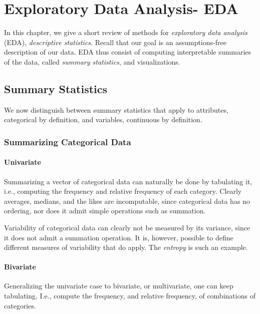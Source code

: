 \chapter[EDA]{Exploratory Data Analysis- EDA}
\label{sec:exploratory}


In this chapter, we give a short review of methods for \emph{exploratory data analysis} (EDA), \aka \emph{descriptive statistics}.
Recall that our goal is an assumptions-free description of our data. 
EDA thus consist of computing interpretable summaries of the data, called \emph{summary statistics}, and visualizations. 


\section{Summary Statistics}
\label{sec:summary_statistics}

We now distinguish between summary statistics that apply to attributes, categorical by definition, and variables, continuous by definition. 


\subsection{Summarizing Categorical Data}

\subsubsection{Univariate}
Summarizing a vector of categorical data can naturally be done by tabulating it, i.e., computing the frequency and relative frequency of each category.
Clearly averages, medians, and the likes are incomputable, since categorical data has no ordering, nor does it admit simple operations such as summation.

\begin{extra}
Variability of categorical data can clearly not be measured by its variance, since it does not admit a summation operation.
It is, however, possible to define different measures of variability that do apply.
The \emph{entropy} is such an example.
\end{extra}


\subsubsection{Bivariate}
Generalizing the univariate case to bivariate, or multivariate, one can keep tabulating. I.e., compute the frequency, and relative frequency, of combinations of categories.



